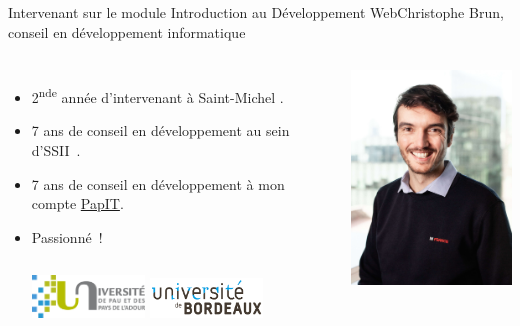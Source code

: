 \documentclass{beamer}
\begin{document}
    \begin{frame}{Intervenant sur le module Introduction au Développement Web}{Christophe Brun, conseil en développement informatique}

        \begin{columns}
            \begin{itemize}
                \item 2\textsuperscript{nde} année d'intervenant à Saint-Michel .

                \item 7 ans de conseil en développement au sein d'SSII~.

                \item 7 ans de conseil en développement à mon compte \href{https://papit.fr}{PapIT}.

                \item Passionné~!
                \bigbreak
                \begin{columns}
                    \centering
                    \includegraphics[width=3cm]{image/logo-uppa}
                    \centering
                    \includegraphics[width=3cm]{image/logo-universite-bordeaux}
                \end{columns}
            \end{itemize}
            \centering
            \includegraphics[width=5cm]{image/trombine-christophe}
        \end{columns}
    \end{frame}
\end{document}
